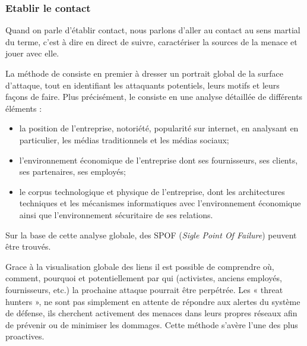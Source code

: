 \subsubsection{Etablir le contact}

Quand on parle d'établir contact, nous parlons d'aller au contact au sens martial du terme, c'est à dire en direct de suivre, caractériser la sources de la menace et jouer avec elle.

La méthode de  consiste en premier à dresser un portrait global de la surface d’attaque, tout en identifiant les attaquants potentiels, leurs motifs et leurs façons de faire. Plus précisément, le  consiste en une analyse détaillée de différents éléments :

\begin{itemize}
	\item la position de  l’entreprise,  notoriété, popularité sur internet, en analysant en particulier,  les médias traditionnels et les médias sociaux;
	\item l'environnement économique de l’entreprise dont ses fournisseurs, ses clients, ses partenaires, ses employés;
	\item le corpus technologique et physique de l'entreprise, dont les architectures techniques et les mécanismes informatiques avec l'environnement économique ainsi que l'environnement sécuritaire de ses relations.
\end{itemize}

Sur la base de cette analyse globale, des SPOF (\textit{Sigle Point Of Failure}) peuvent être trouvés. 

Grace à la visualisation  globale des liens il est possible  de comprendre où, comment, pourquoi et potentiellement par qui (activistes, anciens employés, fournisseurs, etc.) la prochaine attaque pourrait être perpétrée. 
Les « threat hunters », ne sont pas simplement en attente de répondre aux alertes du système de défense, ils cherchent activement des menaces dans leurs propres réseaux afin de prévenir ou de minimiser les dommages. Cette méthode s’avère l’une des plus proactives. 


